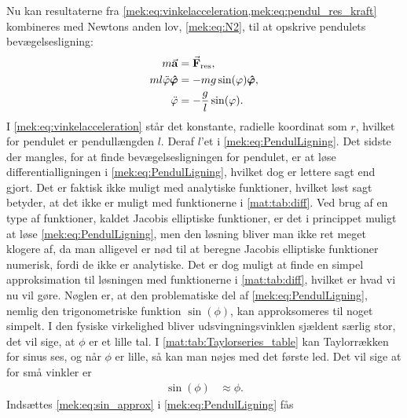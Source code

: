 \begin{example}[Newtonsk beskrivelse af et pendul]

Nu kan resultaterne fra \cref{mek:eq:vinkelacceleration,mek:eq:pendul_res_kraft} kombineres med Newtons anden lov, \cref{mek:eq:N2}, til at opskrive pendulets bevægelsesligning:
%
\begin{align} \label{mek:eq:PendulLigning}
\begin{aligned}
    m\va{a} &= \va{F}_\textup{res}, \\
    ml\ddot{\varphi}\vu*{\varphi} &= -mg\sin(\varphi)\vu*{\varphi}, \\
	\ddot{\varphi} &= -\frac{g}{l}\sin(\varphi).
\end{aligned}
\end{align}
%
I \cref{mek:eq:vinkelacceleration} står det konstante, radielle koordinat som $r$, hvilket for pendulet er pendullængden $l$. Deraf $l$'et i \cref{mek:eq:PendulLigning}. Det sidste der mangles, for at finde bevægelsesligningen for pendulet, er at løse differentialligningen i \cref{mek:eq:PendulLigning}, hvilket dog er lettere sagt end gjort. Det er faktisk ikke muligt med analytiske funktioner, hvilket løst sagt betyder, at det ikke er muligt med funktionerne i \cref{mat:tab:diff}. Ved brug af en type af funktioner, kaldet Jacobis elliptiske funktioner, er det i princippet muligt at løse \cref{mek:eq:PendulLigning}, men den løsning bliver man ikke ret meget klogere af, da man alligevel er nød til at beregne Jacobis elliptiske funktioner numerisk, fordi de ikke er analytiske. Det er dog muligt at finde en simpel approksimation til løsningen med funktionerne i \cref{mat:tab:diff}, hvilket er hvad vi nu vil gøre. Nøglen er, at den problematiske del af \cref{mek:eq:PendulLigning}, nemlig den trigonometriske funktion $\sin(\phi)$, kan approksomeres til noget simpelt. I den fysiske virkelighed bliver udsvingningsvinklen sjældent særlig stor, det vil sige, at $\phi$ er et lille tal. I \cref{mat:tab:Taylorseries_table} kan Taylorrækken for sinus ses, og når $\phi$ er lille, så kan man nøjes med det første led. Det vil sige at for små vinkler er
%
\begin{align}
    \sin(\phi) &\approx \phi. \label{mek:eq:sin_approx}
\end{align}
%
Indsættes \cref{mek:eq:sin_approx} i \cref{mek:eq:PendulLigning} fås

\end{example}
